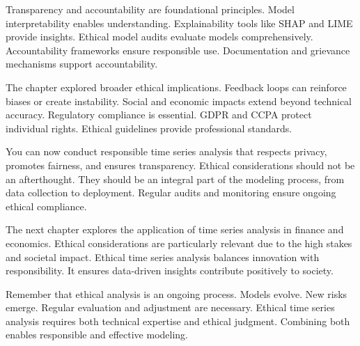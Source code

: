 Transparency and accountability are foundational principles. Model interpretability enables understanding. Explainability tools like SHAP and LIME provide insights. Ethical model audits evaluate models comprehensively. Accountability frameworks ensure responsible use. Documentation and grievance mechanisms support accountability.

The chapter explored broader ethical implications. Feedback loops can reinforce biases or create instability. Social and economic impacts extend beyond technical accuracy. Regulatory compliance is essential. GDPR and CCPA protect individual rights. Ethical guidelines provide professional standards.

You can now conduct responsible time series analysis that respects privacy, promotes fairness, and ensures transparency. Ethical considerations should not be an afterthought. They should be an integral part of the modeling process, from data collection to deployment. Regular audits and monitoring ensure ongoing ethical compliance.

The next chapter explores the application of time series analysis in finance and economics. Ethical considerations are particularly relevant due to the high stakes and societal impact. Ethical time series analysis balances innovation with responsibility. It ensures data-driven insights contribute positively to society.

Remember that ethical analysis is an ongoing process. Models evolve. New risks emerge. Regular evaluation and adjustment are necessary. Ethical time series analysis requires both technical expertise and ethical judgment. Combining both enables responsible and effective modeling.


